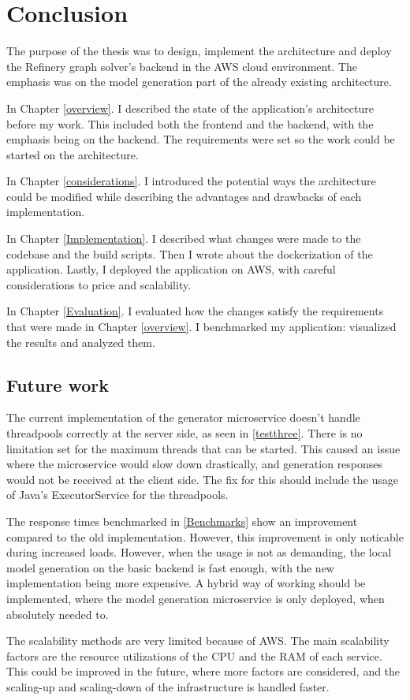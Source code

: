 \chapter{Conclusion}

	The purpose of the thesis was to design, implement the architecture and deploy the Refinery graph solver's backend in the AWS cloud environment.
	The emphasis was on the model generation part of the already existing architecture.

	In Chapter \ref{overview}. I described the state of the application's architecture before my work. This included both the frontend and the backend, with
	the emphasis being on the backend. The requirements were set so the work could be started on the architecture.

	In Chapter \ref{considerations}. I introduced the potential ways the architecture could be modified while describing the advantages and drawbacks
	of each implementation.  

	In Chapter \ref{Implementation}. I described what changes were made to the codebase and the build scripts. Then I wrote about the dockerization 
	of the application. Lastly, I deployed the application on AWS, with careful considerations to price and scalability.

	In Chapter \ref{Evaluation}. I evaluated how the changes satisfy the requirements that were made in Chapter \ref{overview}. I benchmarked
	my application: visualized the results and analyzed them.

	\section{Future work}
		The current implementation of the generator microservice doesn't handle threadpools correctly at the server side, as seen in \ref{testthree}.
		There is no limitation set for the maximum threads that can be started.
		This caused an issue where the microservice would slow down drastically, and generation responses would not be received 
		at the client side. The fix for this should include the usage of Java's ExecutorService for the threadpools.

		The response times benchmarked in \ref{Benchmarks} show an improvement compared to the old implementation. However, this improvement
		is only noticable during increased loads. However, when the usage is not as demanding, the local model generation on the basic backend
		is fast enough, with the new implementation being more expensive. A hybrid way of working should be implemented, where the model generation 
		microservice is only deployed, when absolutely needed to. 

		The scalability methods are very limited because of AWS. The main scalability factors are the resource utilizations
		of the CPU and the RAM of each service. This could be improved in the future, where more factors are considered, and the scaling-up and 
		scaling-down of the infrastructure is handled faster.